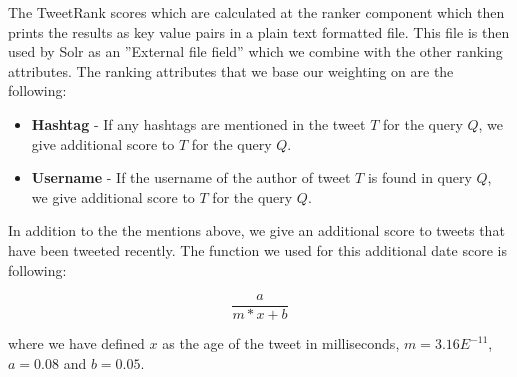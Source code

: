 The TweetRank scores which are calculated at the ranker component which then prints the results as key value pairs in a plain text formatted file. This file is then used by Solr as an ''External file field'' which we combine with the other ranking attributes. The ranking attributes that we base our weighting on are the following:

\begin{itemize}
	\item \textbf{Hashtag} - If any hashtags are mentioned in the tweet $T$ for the query $Q$, we give additional score to $T$ for the query $Q$.
	\item \textbf{Username} - If the username of the author of tweet $T$ is found in query $Q$, we give additional score to $T$ for the query $Q$.
\end{itemize}

In addition to the the mentions above, we give an additional score to tweets that have been tweeted recently. The function we used for this additional date score is following: 

\begin{equation}
\frac{a}{m*x+b}
\end{equation}

where we have defined $x$ as the age of the tweet in milliseconds, $m = 3.16E^{-11}$, $a = 0.08$ and $b = 0.05$. 